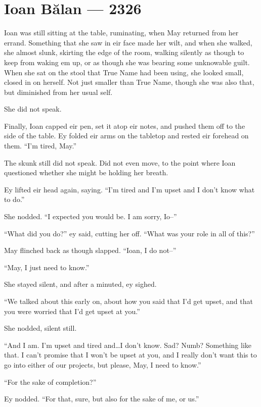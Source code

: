 \hypertarget{ioan-bux103lan-2326}{%
\chapter{Ioan Bălan — 2326}\label{ioan-bux103lan-2326}}

Ioan was still sitting at the table, ruminating, when May returned from her errand. Something that she saw in eir face made her wilt, and when she walked, she almost slunk, skirting the edge of the room, walking silently as though to keep from waking em up, or as though she was bearing some unknowable guilt. When she sat on the stool that True Name had been using, she looked small, closed in on herself. Not just smaller than True Name, though she was also that, but diminished from her usual self.

She did not speak.

Finally, Ioan capped eir pen, set it atop eir notes, and pushed them off to the side of the table. Ey folded eir arms on the tabletop and rested eir forehead on them. ``I'm tired, May.''

The skunk still did not speak. Did not even move, to the point where Ioan questioned whether she might be holding her breath.

Ey lifted eir head again, saying. ``I'm tired and I'm upset and I don't know what to do.''

She nodded. ``I expected you would be. I am sorry, Io--''

``What did you do?'' ey said, cutting her off. ``What was your role in all of this?''

May flinched back as though slapped. ``Ioan, I do not--''

``May, I just need to know.''

She stayed silent, and after a minuted, ey sighed.

``We talked about this early on, about how you said that I'd get upset, and that you were worried that I'd get upset at you.''

She nodded, silent still.

``And I am. I'm upset and tired and\ldots I don't know. Sad? Numb? Something like that. I can't promise that I won't be upset at you, and I really don't want this to go into either of our projects, but please, May, I need to know.''

``For the sake of completion?''

Ey nodded. ``For that, sure, but also for the sake of me, or us.''

